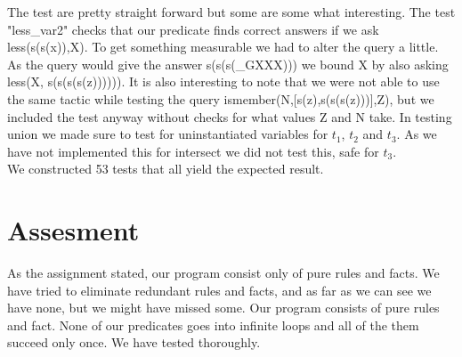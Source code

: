 \documentclass[]{article}
\begin{document}
The test are pretty straight forward but some are some what interesting. The test "less\_var2" checks that our predicate finds correct answers if we ask less(s(s(x)),X). To get something measurable we had to alter the query a little. As the query would give the answer s(s(s(\_GXXX))) we bound X by also asking less(X, s(s(s(s(z)))))). It is also interesting to note that we were not able to use the same tactic while testing the query ismember(N,[s(z),s(s(s(z)))],Z), but we included the test anyway without checks for what values Z and N take. In testing union we made sure to test for uninstantiated variables for $t_1$, $t_2$ and $t_3$. As we have not implemented this for intersect we did not test this, safe for $t_3$.\\
We constructed 53 tests that all yield the expected result.

\section{Assesment} %
\label{sec:assesment}
As the assignment stated, our program consist only of pure rules and facts. We have tried to eliminate redundant rules and facts, and as far as we can see we have none, but we might have missed some.
Our program consists of pure rules and fact. None of our predicates goes into infinite loops and all of the them succeed only once.
We have tested thoroughly.



\end{document}
